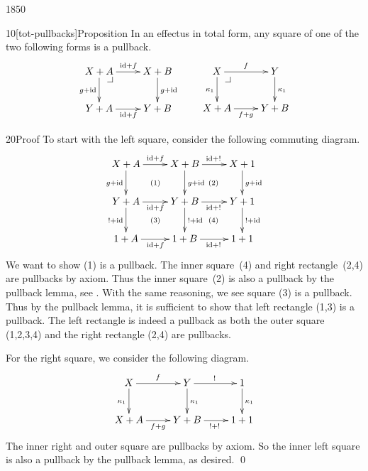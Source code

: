 \begin{parsec}{1850}%
\begin{point}{10}[tot-pullbacks]{Proposition}%
In an effectus in total form,
    any square of one of the two following forms is a pullback.
\begin{equation*}
    \xymatrix{
        X+A \pullback \ar[r]^{\id+f} \ar[d]_{g + \id}
        & X+B \ar[d]^{g+\id}
        \\ Y+A \ar[r]_{\id+f}
        & Y+B
    } \qquad
    \xymatrix{
        X \pullback \ar[d]_{\kappa_1} \ar[r]^{f}
        & Y \ar[d]^{\kappa_1}
        \\
        X+A \ar[r]_{f+g}
        & Y+B
    }
\end{equation*}
\spacingfix{}
\begin{point}{20}{Proof}%
To start with the left square, consider the following commuting diagram.
\begin{equation*}
    \xymatrix{
        X+A \ar@{}[rd]|{(1)} \ar[r]^{\id+f} \ar[d]_{g + \id}
        & X+B \ar@{}[rd]|{(2)} \ar[d]^{g+\id} \ar[r]^{\id+!}
        & X+1 \ar[d]^{g+\id}
        \\ Y+A \ar@{}[rd]|{(3)} \ar[r]_{\id+f} \ar[d]_{!+\id}
        & Y+B \ar@{}[rd]|{(4)} \ar[r]_{\id+!} \ar[d]^{!+\id}
        & Y+1 \ar[d]^{!+\id}
        \\ 1+A \ar[r]_{\id+f}
        & 1+B \ar[r]_{\id+!}
        & 1+1
    }
\end{equation*}
We want to show (1) is a pullback.
The inner square~(4) and right rectangle~(2,4) are pullbacks by axiom.
Thus the inner square~(2) is also a pullback
    by the pullback lemma, see .
With the same reasoning, we see square (3) is a pullback.
Thus by the pullback lemma, it is sufficient to show that
    left rectangle (1,3) is a pullback.
The left rectangle is indeed a pullback
as both the outer square (1,2,3,4)
    and the right rectangle (2,4) are pullbacks.

For the right square, we consider the following diagram.
\begin{equation*}
    \xymatrix{
         X \ar[r]^f \ar[d]_{\kappa_1}
        & Y \ar[r]^{!} \ar[d]^{\kappa_1}
        &1 \ar[d]^{\kappa_1}
        \\ X+A \ar[r]_{f+g}
        & Y+B \ar[r]_{!+!}
        & 1+1
    }
\end{equation*}
The inner right and outer square are pullbacks by axiom.
So the inner left square is also a pullback by the pullback lemma, as desired.
    \qed
\end{point}
\end{point}
\end{parsec}

